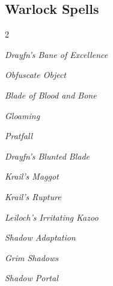 \documentclass[10pt,a4paper,twoside,bg=print,twocolumn,openany,nodeprecatedcode]{dndbook}
\begin{document}
\subsection{Warlock Spells}

\begin{description}
\begin{multicols}{2}
{\par \vspace { 9pt plus 3pt minus 3pt } \noindent  {} \nopagebreak }

\begin{description}
\item \textit{Drayfn's Bane of Excellence}
\item \textit{Obfuscate Object}
\end{description}

{\par \vspace { 9pt plus 3pt minus 3pt } \noindent  {} \nopagebreak }

\begin{description}
\item \textit{Blade of Blood and Bone}
\item \textit{Gloaming}
\item \textit{Pratfall}
\end{description}

{\par \vspace { 9pt plus 3pt minus 3pt } \noindent  {} \nopagebreak }

\begin{description}
\item \textit{Drayfn's Blunted Blade}
\item \textit{Krail's Maggot}
\item \textit{Krail's Rupture}
\item \textit{Leiloch's Irritating Kazoo}
\item \textit{Shadow Adaptation}
\end{description}

{\par \vspace { 9pt plus 3pt minus 3pt } \noindent  {} \nopagebreak }

\begin{description}
\item \textit{Grim Shadows}
\item \textit{Shadow Portal}
\end{description}

{\par \vspace { 9pt plus 3pt minus 3pt } \noindent  {} \nopagebreak }


\end{multicols}
\end{description}
\end{document}

